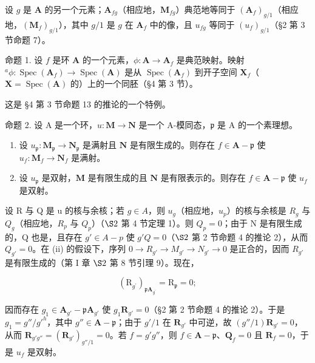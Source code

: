 设 \(g\) 是 \(\mathbf{A}\) 的另一个元素；\(\mathbf{A}_{fg}\)（相应地，\(\mathbf{M}_{fg}\)）典范地等同于 \((\mathbf{A}_f)_{g/1}\)（相应地，\((\mathbf{M}_f)_{g/1}\)），其中 \(g/1\) 是 \(g\) 在 \(\mathbf{A}_f\) 中的像，且 \(u_{fg}\) 等同于 \((u_f)_{g/1}\)（§2 第 3 节命题 7）。

命题 1. 设 \(f\) 是环 \(\mathbf{A}\) 的一个元素，\(\phi: \mathbf{A} \to \mathbf{A}_f\) 是典范映射。映射 \(^a\phi: \operatorname{Spec}(\mathbf{A}_f) \to \operatorname{Spec}(\mathbf{A})\) 是从 \(\operatorname{Spec}(\mathbf{A}_f)\) 到开子空间 \(\mathbf{X}_f\)（\(\mathbf{X} = \operatorname{Spec}(\mathbf{A})\) 的）上的一个同胚（§4 第 3 节）。

这是 §4 第 3 节命题 13 的推论的一个特例。

命题 2. 设 A 是一个环，\(u: \mathbf{M} \to \mathbf{N}\) 是一个 A-模同态，\(\mathfrak{p}\) 是 A 的一个素理想。

\begin{enumerate}
\def\labelenumi{(\roman{enumi})}
\item
  设 \(u_{\mathfrak{p}} \colon \mathbf{M}_{\mathfrak{p}} \to \mathbf{N}_{\mathfrak{p}}\) 是满射且 \(\mathbf{N}\) 是有限生成的。则存在 \(f \in \mathbf{A} - \mathfrak{p}\) 使 \(u_{f} \colon \mathbf{M}_{f} \to \mathbf{N}_{f}\) 是满射。
\item
  设 \(u_{\mathfrak{p}}\) 是双射，\(\mathbf{M}\) 是有限生成的且 \(\mathbf{N}\) 是有限表示的。则存在 \(f \in \mathbf{A} - \mathfrak{p}\) 使 \(u_{f}\) 是双射。
\end{enumerate}

设 R 与 Q 是 u 的核与余核；若 \(g \in A\)，则 \(u_g\)（相应地，\(u_p\)）的核与余核是 \(R_g\) 与 \(Q_g\)（相应地，\(R_p\) 与 \(Q_p\)）（\(\S 2\) 第 4 节定理 1）。则 \(Q_p = 0\)；由于 N 是有限生成的，Q 也是，且存在 \(g' \in A - p\) 使 \(g'Q = 0\)（\(\S 2\) 第 2 节命题 4 的推论 2），从而 \(Q_{g'} = 0\)。在 (ii) 的假设下，序列 \(0 \to R_{g'} \to M_{g'} \to N_{g'} \to 0\) 是正合的，因而 \(R_{g'}\) 是有限生成的（第 I 章 \(\S 2\) 第 8 节引理 9）。现在，

\[
\left(\mathrm{R} _ {g ^ {\prime}}\right) _ {\mathfrak{p}\mathbf{A}_{g ^ {\prime}}} = \mathrm{R} _ {\mathfrak{p}} = 0;
\]

因而存在 \(g_1 \in \mathbf{A}_{g'} - \mathfrak{p}\mathbf{A}_{g'}\) 使 \(g_1\mathbf{R}_{g'} = 0\)（§2 第 2 节命题 4 的推论 2）。于是 \(g_1 = g'' / g'^h\)，其中 \(g'' \in \mathbf{A} - \mathfrak{p}\)；由于 \(g' / 1\) 在 \(\mathbf{R}_{g'}\) 中可逆，故 \((g'' / 1)\mathbf{R}_{g'} = 0\)，从而 \(\mathbf{R}_{g'g''} = (\mathbf{R}_{g'})_{g'' / 1} = 0\)。若 \(f = g'g''\)，则 \(f \in \mathbf{A} - \mathfrak{p}\)、\(\mathbf{Q}_f = 0\) 且 \(\mathbf{R}_f = 0\)，于是 \(u_f\) 是双射。

